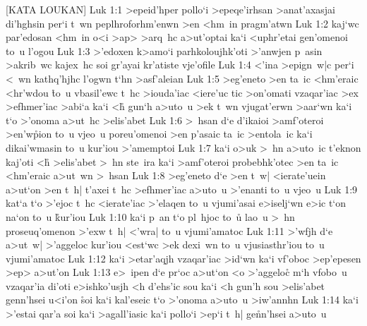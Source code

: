 [KATA LOUKAN]
\vs Luk 1:1
>epeid'hper
pollo`i
>epeqe'irhsan
>anat'axasjai
di'hghsin
per`i
t~wn
peplhroforhm'enwn
>en
<hm~in
pragm'atwn\bibvsend
\vs Luk 1:2
kaj`wc
par'edosan
<hm~in
o<i
>ap>
>arq~hc
a>ut'optai
ka`i
<uphr'etai
gen'omenoi
to~u
l'ogou\bibvsend
\vs Luk 1:3
>'edoxen
k>amo`i
parhkoloujhk'oti
>'anwjen
p~asin
>akrib~wc
kajex~hc
soi
gr'ayai
kr'atiste
vje'ofile\bibvsend
\vs Luk 1:4
<'ina
>epign~w|c
per`i
<~wn
kathq'hjhc
l'ogwn
t`hn
>asf'aleian\bibvsend
\vs Luk 1:5
>eg'eneto
>en
ta~ic
<hm'eraic
<hr'wdou
\r{t}o~u
vbasil'ewc
t~hc
>iouda'iac
<iere'uc
tic
>on'omati
vzaqar'iac
>ex
>efhmer'iac
>abi`a
ka`i
<h\r{}
gun`h
a>uto~u
>ek
t~wn
vjugat'erwn
>aar`wn
ka`i
t`o
>'onoma
a>ut~hc
>elis'abet\bibvsend
\vs Luk 1:6
>~hsan
d`e
d'ikaioi
>amf'oteroi
>en'w\r{p}ion
to~u
vjeo~u
poreu'omenoi
>en
p'asaic
ta~ic
>entola~ic
ka`i
dikai'wmasin
to~u
kur'iou
>'amemptoi\bibvsend
\vs Luk 1:7
ka`i
o>uk
>~hn
a>uto~ic
t'eknon
kaj'oti
<h\r{}
>elis'abet
>~hn
ste~ira
ka`i
>amf'oteroi
probebhk'otec
>en
ta~ic
<hm'eraic
a>ut~wn
>~hsan\bibvsend
\vs Luk 1:8
>eg'eneto
d`e
>en
t~w|
<ierate'uein
a>ut`on
>en
t~h|
t'axei
t~hc
>efhmer'iac
a>uto~u
>'enanti
to~u
vjeo~u\bibvsend
\vs Luk 1:9
kat`a
t`o
>'ejoc
t~hc
<ierate'iac
>'elaqen
to~u
vjumi'asai
e>iselj`wn
e>ic
t`on
na`on
to~u
\r{k}ur'iou\bibvsend
{}
\vs Luk 1:10
ka`i
p~an
t`o
pl~hjoc
to~u\r{}
lao~u
>~hn
proseuq'omenon
>'exw
t~h|
<'wra|
to~u
vjumi'amatoc\bibvsend
\vs Luk 1:11
>'wfjh
d`e
a>ut~w|
>'aggeloc
kur'iou
<est`wc
>ek
dexi~wn
to~u
vjusiasthr'iou
to~u
vjumi'amatoc\bibvsend
\vs Luk 1:12
ka`i
>etar'aqjh
vzaqar'iac
>id`wn
ka`i
vf'oboc
>ep'epesen
>ep>
a>ut'on\bibvsend
\vs Luk 1:13
e>~ipen
d`e
pr`oc
a>ut`on
<o
>'aggelo\r{c}
m`h
vfobo~u
vzaqar'ia
di'oti
e>ishko'usjh
<h
d'ehs'ic
sou
ka`i
<h
gun'h
sou
>elis'abet
genn'hsei
u<i'on
\r{s}oi
ka`i
kal'eseic
t`o
>'onoma
a>uto~u
>iw'annhn\bibvsend
\vs Luk 1:14
ka`i
>'estai
qar'a
soi
ka`i
>agall'iasic
ka`i
pollo`i
>ep`i
t~h|
ge\r{n}n'hsei
a>uto~u
